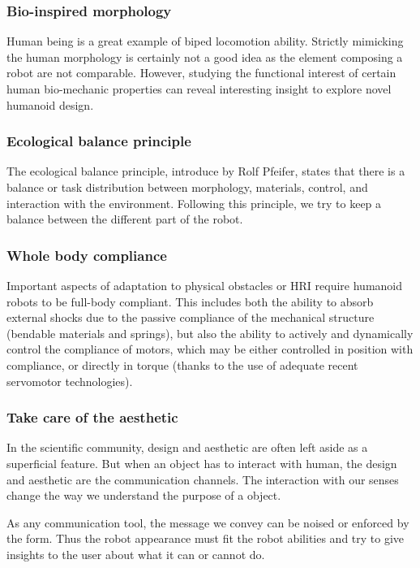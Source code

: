 \subsubsection{Bio-inspired morphology} %
Human being is a great example of biped locomotion ability. Strictly mimicking the human morphology is certainly not a good idea as the element composing a robot are not comparable. However, studying the functional interest of certain human bio-mechanic properties can reveal interesting insight to explore novel humanoid design.

\subsubsection{Ecological balance principle} %
The ecological balance principle, introduce by Rolf Pfeifer, states that there is a balance or task distribution between morphology, materials, control, and interaction with the environment.
Following this principle, we try to keep a balance between the different part of the robot.

\subsubsection{Whole body compliance} %
Important aspects of adaptation to physical obstacles or HRI require humanoid robots to be full-body compliant. This includes both the ability to absorb external shocks due to the passive compliance of the mechanical structure (bendable materials and springs), but also the ability to actively and dynamically control the compliance of motors, which may be either controlled in position with compliance, or directly in torque (thanks to the use of adequate recent servomotor technologies).

\subsubsection{Take care of the aesthetic} %
In the scientific community, design and aesthetic are often left aside as a superficial feature. But when an object has to interact with human, the design and aesthetic are the communication channels. The interaction with our senses change the way we understand the purpose of a object.

As any communication tool, the message we convey can be noised or enforced by the form. Thus the robot appearance must fit the robot abilities and try to give insights to the user about what it can or cannot do.

